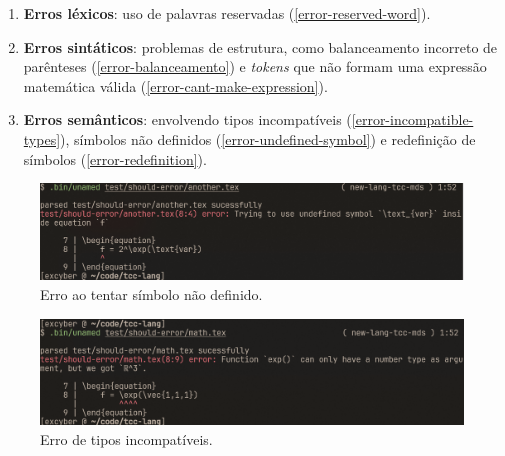 \begin{enumerate}
   \item \textbf{Erros léxicos}: uso de palavras reservadas (\autoref{error-reserved-word}).
   
   \item \textbf{Erros sintáticos}: problemas de estrutura, como balanceamento incorreto de parênteses (\autoref{error-balanceamento}) e \textit{tokens} que não formam uma expressão matemática válida (\autoref{error-cant-make-expression}).
   
   \item \textbf{Erros semânticos}: envolvendo tipos incompatíveis (\autoref{error-incompatible-types}), símbolos não definidos (\autoref{error-undefined-symbol}) e redefinição de símbolos (\autoref{error-redefinition}).
\end{enumerate}



\begin{figure}[H]
    \caption{\label{error-undefined-symbol} \small Erro ao tentar símbolo não definido.}
    \begin{center}
        \includegraphics[scale=0.5]{./Imagens/error-undefined-symbol.png}
    \end{center}
\end{figure}

\begin{figure}[H]
    \caption{\label{error-incompatible-types} \small Erro de tipos incompatíveis.}
    \begin{center}
        \includegraphics[scale=0.5]{./Imagens/error-incompatible-types.png}
    \end{center}
\end{figure}


